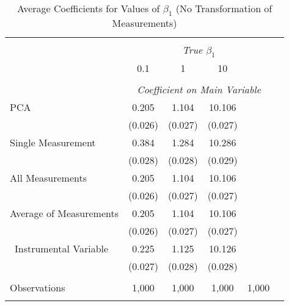 \begin{table}[!htbp] \centering
  \caption{Average Coefficients for Values of $\beta_1$ (No Transformation of Measurements) \label{sim_beta1_5_noexp}}
\begin{tabular}{@{\extracolsep{5pt}}lccccc}
\\[-1.8ex]\hline
\hline \\[-1.8ex]
& \multicolumn{4}{c}{\textit{True $\beta_1$}} \
\cr \
\\[-1.8ex] & 0.1 & 1 & 10\\
\hline \\[-1.8ex]
& \multicolumn{4}{c}{\textit{Coefficient on Main Variable}} \\
 PCA & 0.205 & 1.104 & 10.106  \\
  & (0.026) & (0.027) & (0.027)\\
  Single Measurement & 0.384 & 1.284 & 10.286  \\
& (0.028) & (0.028) & (0.029)\\
 All Measurements & 0.205 & 1.104 & 10.106  \\
  & (0.026) & (0.027) & (0.027)\\
 Average of Measurements & 0.205 & 1.104 & 10.106  \\
  & (0.026) & (0.027) & (0.027)\\\
  Instrumental Variable & 0.225 & 1.125 & 10.126 \\
& (0.027) & (0.028) & (0.028) \\

\hline \\[-1.8ex]
 Observations & 1,000 & 1,000 & 1,000 & 1,000 &\\
\hline
\hline \\[-1.8ex]
\end{tabular}
\end{table}